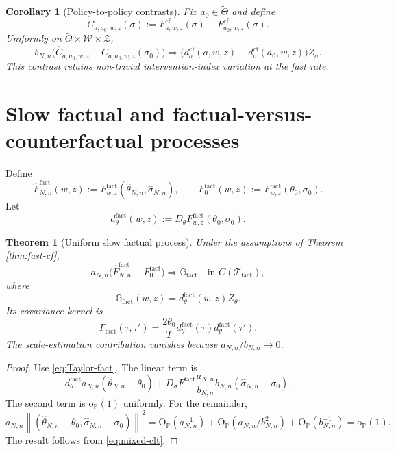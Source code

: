 \documentclass[11pt]{article}
\newtheorem{theorem}[assumption]{Theorem}
\newtheorem{corollary}[assumption]{Corollary}
\theoremstyle{remark}
\newcommand{\Pp}{\mathbb P}
\newcommand{\op}{\mathrm{o}_{\Pp}}
\newcommand{\Op}{\mathrm{O}_{\Pp}}
\newcommand{\cf}{\mathrm{cf}}
\newcommand{\fact}{\mathrm{fact}}
\newcommand{\cW}{\mathcal W}
\newcommand{\cT}{\mathcal T}
\newcommand{\cZ}{\mathcal Z}
\newcommand{\norm}[1]{\left\lVert #1\right\rVert}
\newcommand{\an}{a_{N,n}}
\newcommand{\bn}{b_{N,n}}
\newcommand{\thetahat}{\widehat\theta_{N,n}}
\newcommand{\sigmahat}{\widehat\sigma_{N,n}}
\begin{document}
\begin{corollary}[Policy-to-policy contrasts]\label{cor:policy-contrast}
Fix $a_0\in\widetilde\Theta$ and define
\[
 C_{a,a_0,w,z}(\sigma)
 :=F^{\cf}_{a,w,z}(\sigma)-F^{\cf}_{a_0,w,z}(\sigma).
\]
Uniformly on $\widetilde\Theta\times\cW\times\cZ$,
\[
 \bn\big(\widehat C_{a,a_0,w,z}-C_{a,a_0,w,z}(\sigma_0)\big)
 \Rightarrow
 \big(d_\sigma^{\cf}(a,w,z)-d_\sigma^{\cf}(a_0,w,z)\big)Z_\sigma.
\]
This contrast retains non-trivial intervention-index variation at the fast rate.
\end{corollary}

\section{Slow factual and factual-versus-counterfactual processes}

Define
\[
 \widehat F^{\fact}_{N,n}(w,z)
 :=F^{\fact}_{w,z}(\thetahat,\sigmahat),
 \qquad
 F^{\fact}_0(w,z)
 :=F^{\fact}_{w,z}(\theta_0,\sigma_0).
\]
Let
\begin{equation}\label{eq:dtheta0}
 d_\theta^{\fact}(w,z)
 :=D_\theta F^{\fact}_{w,z}(\theta_0,\sigma_0).
\end{equation}

\begin{theorem}[Uniform slow factual process]\label{thm:slow-fact}
Under the assumptions of Theorem \ref{thm:fast-cf},
\begin{equation}\label{eq:slow-fact-clt}
 \an\big(\widehat F^{\fact}_{N,n}-F^{\fact}_0\big)
 \Rightarrow \mathbb G_{\fact}
 \quad\text{in }C(\cT_{\fact}),
\end{equation}
where
\begin{equation}\label{eq:Gfact}
 \mathbb G_{\fact}(w,z)
 =d_\theta^{\fact}(w,z)Z_\theta.
\end{equation}
Its covariance kernel is
\begin{equation}\label{eq:Gamma-fact}
 \Gamma_{\fact}(\tau,\tau')
 =\frac{2\theta_0}{T}
 d_\theta^{\fact}(\tau)d_\theta^{\fact}(\tau').
\end{equation}
The scale-estimation contribution vanishes because $\an/\bn\to0$.
\end{theorem}

\begin{proof}
Use \eqref{eq:Taylor-fact}.  The linear term is
\[
 d_\theta^{\fact}\an(\thetahat-\theta_0)
 +D_\sigma F^{\fact}\frac{\an}{\bn}\bn(\sigmahat-\sigma_0).
\]
The second term is $\op(1)$ uniformly.  For the remainder,
\[
 \an\norm{(\thetahat-\theta_0,\sigmahat-\sigma_0)}^2
 =\Op(\an^{-1})+\Op(\an/\bn^2)+\Op(\bn^{-1})=\op(1).
\]
The result follows from \eqref{eq:mixed-clt}.
\end{proof}
\end{document}
